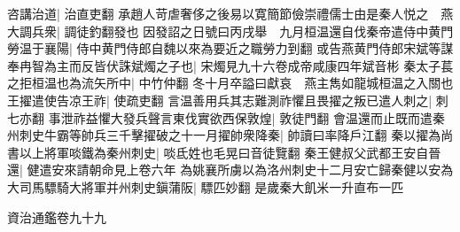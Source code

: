 咨講治道|{
	治直吏翻}
承趙人苛虐奢侈之後易以寛簡節儉崇禮儒士由是秦人悦之　燕大調兵衆|{
	調徒釣翻發也}
因發詔之日號曰丙戌舉　九月桓温還自伐秦帝遣侍中黄門勞温于襄陽|{
	侍中黄門侍郎自魏以來為要近之職勞力到翻}
或告燕黄門侍郎宋斌等謀奉冉智為主而反皆伏誅斌燭之子也|{
	宋燭見九十六卷成帝咸康四年斌音彬}
秦太子萇之拒桓温也為流矢所中|{
	中竹仲翻}
冬十月卒謚曰獻哀　燕主雋如龍城桓温之入關也王擢遣使告凉王祚|{
	使疏吏翻}
言温善用兵其志難測祚懼且畏擢之叛已遣人刺之|{
	刺七亦翻}
事泄祚益懼大發兵聲言東伐實欲西保敦煌|{
	敦徒門翻}
會温還而止既而遣秦州刺史牛霸等帥兵三千擊擢破之十一月擢帥衆降秦|{
	帥讀曰率降戶江翻}
秦以擢為尚書以上將軍啖鐵為秦州刺史|{
	啖氐姓也毛晃曰音徒覽翻}
秦王健叔父武都王安自晉還|{
	健遣安來請朝命見上卷六年}
為姚襄所虜以為洛州刺史十二月安亡歸秦健以安為大司馬驃騎大將軍并州刺史鎭蒲阪|{
	驃匹妙翻}
是歲秦大飢米一升直布一匹

資治通鑑卷九十九
